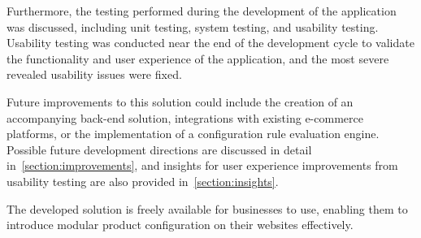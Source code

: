 Furthermore, the testing performed during the development of the application was discussed, including unit testing, system testing, and usability testing. Usability testing was conducted near the end of the development cycle to validate the functionality and user experience of the application, and the most severe revealed usability issues were fixed.

Future improvements to this solution could include the creation of an accompanying back-end solution, integrations with existing e-commerce platforms, or the implementation of a configuration rule evaluation engine. Possible future development directions are discussed in detail in~\autoref{section:improvements}, and insights for user experience improvements from usability testing are also provided in~\autoref{section:insights}.

The developed solution is freely available for businesses to use, enabling them to introduce modular product configuration on their websites effectively.
